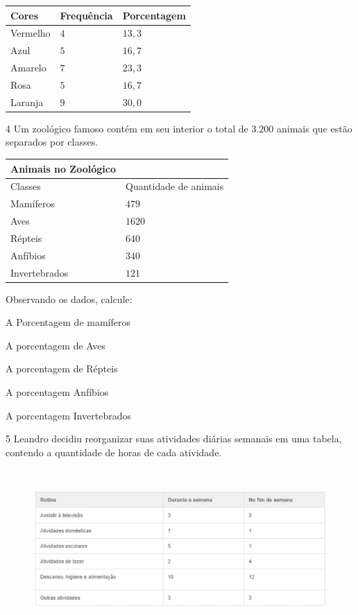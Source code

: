 
\begin{longtable}[]{@{}lll@{}}
\toprule
Cores & Frequência & Porcentagem\tabularnewline
\midrule
\endhead
Vermelho & $4$ & $13,3$\tabularnewline
Azul & $5$ & $16,7$\tabularnewline
Amarelo & $7$ & $23,3$\tabularnewline
Rosa & $5$ & $16,7$\tabularnewline
Laranja & $9$ & $30,0$\tabularnewline
\bottomrule
\end{longtable}

\reduline{\hfill}

\num{4}  Um zoológico famoso contém em seu interior o total de $3.200$ animais
que estão separados por classes.

\begin{longtable}[]{@{}ll@{}}
\toprule
Animais no Zoológico &\tabularnewline
\midrule
\endhead
Classes & Quantidade de animais\tabularnewline
Mamíferos & $479$\tabularnewline
Aves & $1620$\tabularnewline
Répteis & $640$\tabularnewline
Anfíbios & $340$\tabularnewline
Invertebrados & $121$\tabularnewline
\bottomrule
\end{longtable}

Observando os dados, calcule:

\begin{escolha}
\item A Porcentagem de mamíferos 
\item A porcentagem de Aves 
\item A porcentagem de Répteis 
\item A porcentagem Anfíbios 
\item A porcentagem Invertebrados 
\end{escolha}

\num{5}  Leandro decidiu reorganizar suas atividades diárias semanais em uma
tabela, contendo a quantidade de horas de cada atividade.

\begin{figure}
\includegraphics[width=5.90556in,height=2.41638in]{./imgSAEB_6_MAT/media/image83.png}
\end{figure}

